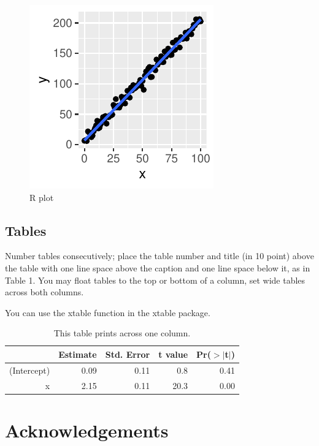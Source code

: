\documentclass[10pt, letterpaper]{article}
\newenvironment{CodeChunk}{}{}
\begin{document}
\begin{CodeChunk}
\begin{figure}[H]

{\centering \includegraphics{figs/plot-1} 

}

\caption[R plot]{R plot}\label{fig:plot}
\end{figure}
\end{CodeChunk}

\hypertarget{tables}{%
\subsection{Tables}\label{tables}}

Number tables consecutively; place the table number and title (in 10
point) above the table with one line space above the caption and one
line space below it, as in Table 1. You may float tables to the top or
bottom of a column, set wide tables across both columns.

You can use the xtable function in the xtable package.

\begin{table}[H]
\centering
\begin{tabular}{rrrrr}
  \hline
 & Estimate & Std. Error & t value & Pr($>$$|$t$|$) \\ 
  \hline
(Intercept) & 0.09 & 0.11 & 0.8 & 0.41 \\ 
  x & 2.15 & 0.11 & 20.3 & 0.00 \\ 
   \hline
\end{tabular}
\caption{This table prints across one column.} 
\end{table}

\hypertarget{acknowledgements}{%
\section{Acknowledgements}\label{acknowledgements}}
\end{document}
